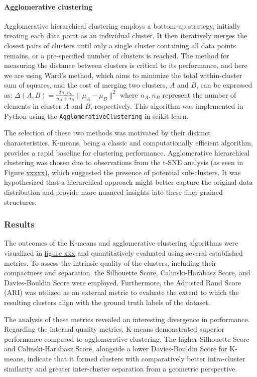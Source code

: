\documentclass{article}
\begin{document}
\paragraph{Agglomerative clustering} Agglomerative hierarchical clustering employs a bottom-up strategy, initially treating each data point as an individual cluster. It then iteratively merges the closest pairs of clusters until only a single cluster containing all data points remains, or a pre-specified number of clusters is reached. The method for measuring the distance between clusters is critical to its performance, and here we are using Ward's method, which aims to minimize the total within-cluster sum of squares, and the cost of merging two clusters, $A$ and $B$, can be expressed as: $\Delta(A, B)=\frac{2n_An_b}{n_A+n_B}\|\mu_A-\mu_B\|^2$ where $n_A, n_B$ represent the number of elements in cluster $A$ and $B$, respectively. This algorithm was implemented in Python using the \texttt{AgglomerativeClustering} in scikit-learn.

The selection of these two methods was motivated by their distinct characteristics. K-means, being a classic and computationally efficient algorithm, provides a rapid baseline for clustering performance. Agglomerative hierarchical clustering was chosen due to observations from the t-SNE analysis (as seen in Figure \underline{xxxxx}), which suggested the presence of potential sub-clusters. It was hypothesized that a hierarchical approach might better capture the original data distribution and provide more nuanced insights into these finer-grained structures.

\subsubsection*{Results}

The outcomes of the K-means and agglomerative clustering algorithms were visualized in \underline{figure xxx} and quantitatively evaluated using several established metrics. To assess the intrinsic quality of the clusters, including their compactness and separation, the Silhouette Score, Calinski-Harabasz Score, and Davies-Bouldin Score were employed. Furthermore, the Adjusted Rand Score (ARI) was utilized as an external metric to evaluate the extent to which the resulting clusters align with the ground truth labels of the dataset.

The analysis of these metrics revealed an interesting divergence in performance. Regarding the internal quality metrics, K-means demonstrated superior performance compared to agglomerative clustering. The higher Silhouette Score and Calinski-Harabasz Score, alongside a lower Davies-Bouldin Score for K-means, indicate that it formed clusters with comparatively better intra-cluster similarity and greater inter-cluster separation from a geometric perspective.
\end{document}

